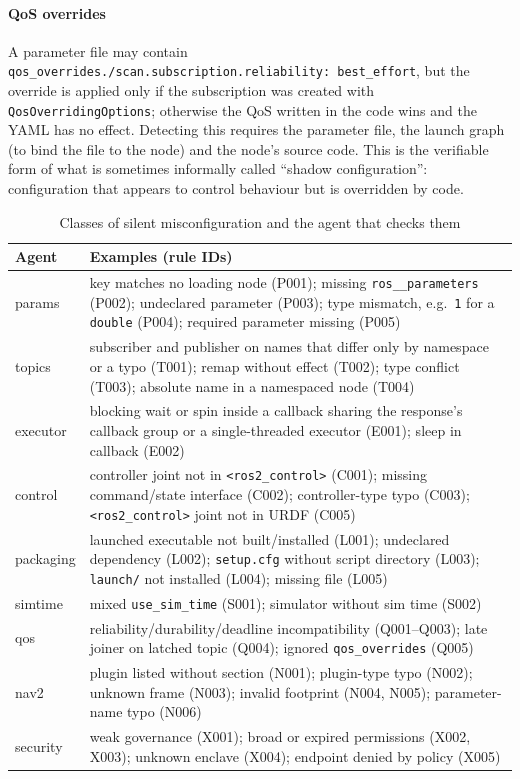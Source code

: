 ﻿\documentclass[conference]{IEEEtran}
\newcommand{\code}[1]{\texttt{#1}}
\begin{document}
\paragraph{QoS overrides} A parameter file may contain
\code{qos\_overrides./scan.subscription.reliability: best\_effort}, but the override is applied
only if the subscription was created with \code{QosOverridingOptions}; otherwise the QoS
written in the code wins and the YAML has no effect. Detecting this requires the parameter file,
the launch graph (to bind the file to the node) and the node's source code. This is the
verifiable form of what is sometimes informally called ``shadow configuration'': configuration
that appears to control behaviour but is overridden by code.

\begin{table}[t]
\centering
\caption{Classes of silent misconfiguration and the agent that checks them}
\label{tab:examples}
\footnotesize
\begin{tabular}{@{}p{0.9cm}p{6.9cm}@{}}
\toprule
Agent & Examples (rule IDs) \\
\midrule
params & key matches no loading node (P001); missing \code{ros\_\_parameters} (P002); undeclared parameter (P003); type mismatch, e.g.\ \code{1} for a \code{double} (P004); required parameter missing (P005)\\
topics & subscriber and publisher on names that differ only by namespace or a typo (T001); remap without effect (T002); type conflict (T003); absolute name in a namespaced node (T004)\\
executor & blocking wait or spin inside a callback sharing the response's callback group or a single-threaded executor (E001); sleep in callback (E002)\\
control & controller joint not in \code{<ros2\_control>} (C001); missing command/state interface (C002); controller-type typo (C003); \code{<ros2\_control>} joint not in URDF (C005)\\
packaging & launched executable not built/installed (L001); undeclared dependency (L002); \code{setup.cfg} without script directory (L003); \code{launch/} not installed (L004); missing file (L005)\\
simtime & mixed \code{use\_sim\_time} (S001); simulator without sim time (S002)\\
qos & reliability/durability/deadline incompatibility (Q001--Q003); late joiner on latched topic (Q004); ignored \code{qos\_overrides} (Q005)\\
nav2 & plugin listed without section (N001); plugin-type typo (N002); unknown frame (N003); invalid footprint (N004, N005); parameter-name typo (N006)\\
security & weak governance (X001); broad or expired permissions (X002, X003); unknown enclave (X004); endpoint denied by policy (X005)\\
\bottomrule
\end{tabular}
\end{table}
\end{document}
